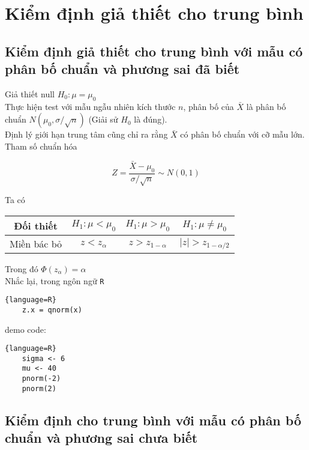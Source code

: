 \chapter{Kiểm định giả thiết cho trung bình}

\section{Kiểm định giả thiết cho trung bình với mẫu có phân bố chuẩn và phương sai đã biết}
Giả thiết null $H_0: \mu = \mu_0$ \\
Thực hiện test với mẫu ngẫu nhiên kích thước $n$, phân bố của $\bar{X}$ là phân bố chuẩn $N(\mu_0, \sigma / \sqrt{n})$
(Giải sử $H_0$ là đúng). \\
Định lý giới hạn trung tâm cũng chỉ ra rằng $\bar{X}$ có phân bố chuẩn với cỡ mẫu lớn. \\
Tham số chuẩn hóa 

\begin{equation}
    Z = \frac{\bar{X} - \mu_0}{\sigma / \sqrt{n}} \sim N(0, 1)
\end{equation}

Ta có

\begin{center}
    \begin{tabular}{| c | c | c | c |}
        \hline
        Đối thiết & $H_1: \mu < \mu_0$ & $H_1: \mu > \mu_0$ & $H_1: \mu \neq \mu_0$ \\
        \hline
        Miền bác bỏ & $z < z_{\alpha}$ & $z > z_{1-\alpha}$ & $\lvert z \rvert > z_{1 - \alpha / 2}$ \\
        \hline
    \end{tabular}
\end{center}

Trong đó $\Phi(z_\alpha) = \alpha$ \\
Nhắc lại, trong ngôn ngữ \lstinline{R}
\begin{lstlisting}{language=R}
    z.x = qnorm(x)
\end{lstlisting}

demo code: 
\begin{lstlisting}{language=R}
    sigma <- 6
    mu <- 40
    pnorm(-2)
    pnorm(2)
\end{lstlisting}


\section{Kiểm định cho trung bình với mẫu có phân bố chuẩn và phương sai chưa biết}

